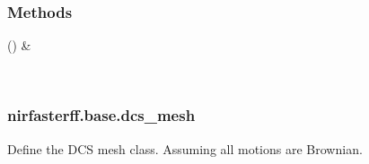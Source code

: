 \documentclass[letterpaper,10pt,english]{sphinxmanual}
\begin{document}
\begin{fulllineitems}
\begin{fulllineitems}
\begin{quote}
\begin{description}
\end{description}\end{quote}

\end{fulllineitems}


\begin{fulllineitems}
\label{\detokenize{_autosummary/nirfasterff.base.data.meshvol:nirfasterff.base.data.meshvol.__init__}}
\pysigstartsignatures
{}
\pysigstopsignatures
\end{fulllineitems}

\subsubsection*{Methods}


\begin{savenotes}\sphinxattablestart
\sphinxthistablewithglobalstyle
\sphinxthistablewithnovlinesstyle
\centering
\begin{tabulary}{\linewidth}[t]{}
\sphinxtoprule
\sphinxtableatstartofbodyhook
\sphinxAtStartPar
{\hyperref[\detokenize{_autosummary/nirfasterff.base.data.meshvol:nirfasterff.base.data.meshvol.__init__}]{}}()
&
\sphinxAtStartPar

\\
\sphinxbottomrule
\end{tabulary}
\sphinxtableafterendhook\par
\sphinxattableend\end{savenotes}

\end{fulllineitems}


\sphinxstepscope


\subsubsection{nirfasterff.base.dcs\_mesh}
\label{\detokenize{_autosummary/nirfasterff.base.dcs_mesh:module-nirfasterff.base.dcs_mesh}}\label{\detokenize{_autosummary/nirfasterff.base.dcs_mesh:nirfasterff-base-dcs-mesh}}\label{\detokenize{_autosummary/nirfasterff.base.dcs_mesh::doc}}
\sphinxAtStartPar
Define the DCS mesh class. Assuming all motions are Brownian.
\end{document}
